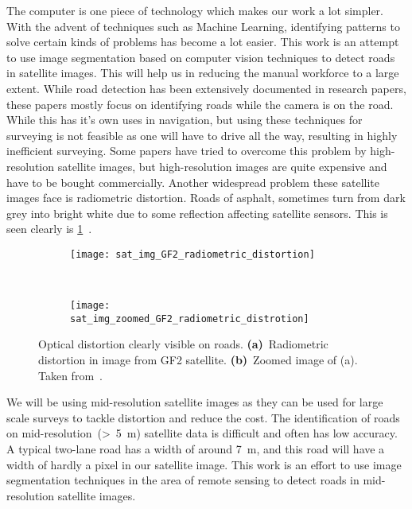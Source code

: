 The computer is one piece of technology which makes our work a lot simpler. With the advent of techniques such as Machine Learning, identifying patterns to solve certain kinds of problems has become a lot easier. This work is an attempt to use image segmentation based on computer vision techniques to detect roads in satellite images. This will help us in reducing the manual workforce to a large extent. While road detection has been extensively documented in research papers, these papers mostly focus on identifying roads while the camera is on the road. While this has it's own uses in navigation, but using these techniques for surveying is not feasible as one will have to drive all the way, resulting in highly inefficient surveying. Some papers have tried to overcome this problem by high-resolution satellite images, but high-resolution images are quite expensive and have to be bought commercially. Another widespread problem these satellite images face is radiometric distortion. Roads of asphalt, sometimes turn from dark grey into bright white due to some reflection affecting satellite sensors. This is seen clearly is \cref{fig:sat_img_radiometric_distortion}~\cite{GF2-imageCaseStudy}. 

\begin{figure}[h!]
  \centering
  \begin{subfigure}{0.48\textwidth}
    \texttt{[image: sat\_img\_GF2\_radiometric\_distortion]}
    \caption{}
  \end{subfigure}~
  \begin{subfigure}{0.48\textwidth}
    \texttt{[image: sat\_img\_zoomed\_GF2\_radiometric\_distrotion]}
    \caption{}
  \end{subfigure}
  \caption[Optical distortion clearly visible on roads]{Optical distortion clearly visible on roads. \textbf{(a)}~Radiometric distortion in image from GF2 satellite. \textbf{(b)}~Zoomed image of (a). Taken from~\cite{GF2-imageCaseStudy}.}
  \label{fig:sat_img_radiometric_distortion}
\end{figure}

We will be using mid-resolution satellite images as they can be used for large scale surveys to tackle distortion and reduce the cost. The identification of roads on mid-resolution~(>~5~m) satellite data is difficult and often has low accuracy. A typical two-lane road has a width of around 7~m, and this road will have a width of hardly a pixel in our satellite image. This work is an effort to use image segmentation techniques in the area of remote sensing to detect roads in mid-resolution satellite images.

